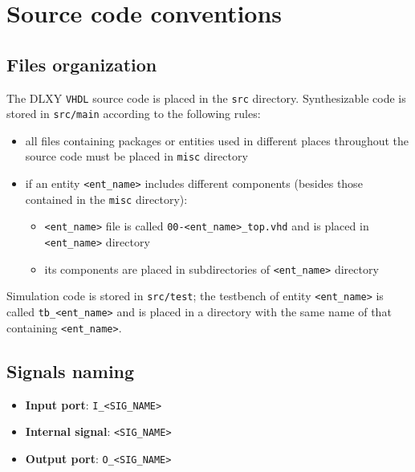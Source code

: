 \chapter{Source code conventions}
\label{app:code_conventions}

\section{Files organization}
The DLXY \texttt{VHDL} source code is placed in the \texttt{src} directory.
Synthesizable code is stored in \texttt{src/main} according to the following rules:
\begin{itemize}
	\item all files containing packages or entities used in different places
		throughout the source code must be placed in \texttt{misc} directory
	\item if an entity \texttt{<ent\_name>} includes different components
		(besides those contained in the \texttt{misc} directory):
		\begin{itemize}
			\item \texttt{<ent\_name>} file is called \texttt{00-<ent\_name>\_top.vhd}
				and is placed in \texttt{<ent\_name>} directory
			\item its components are placed in subdirectories of \texttt{<ent\_name>}
				directory
		\end{itemize}
\end{itemize}

Simulation code is stored in \texttt{src/test}; the testbench of entity
\texttt{<ent\_name>} is called \texttt{tb\_<ent\_name>} and is placed in a
directory with the same name of that containing \texttt{<ent\_name>}.

\section{Signals naming}
\begin{itemize}
	\item \textbf{Input port}: \texttt{I\_<SIG\_NAME>}
	\item \textbf{Internal signal}: \texttt{<SIG\_NAME>}
	\item \textbf{Output port}: \texttt{O\_<SIG\_NAME>}
\end{itemize}

